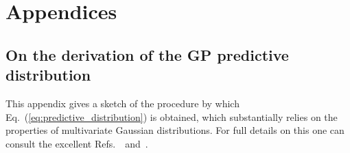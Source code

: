 
\setcounter{chapter}{-1}
\chapter{Appendices}
\renewcommand{\thechapter}{A}


\section{On the derivation of the GP predictive distribution}
\label{sec:Appendix_derivation_pred_dist}

This appendix gives a sketch of the procedure by which Eq.~(\ref{eq:predictive_distribution}) is obtained, which substantially relies on the properties of multivariate Gaussian distributions. For full details on this one can consult the excellent Refs.~\citep{Bishop:998831}~and~\citep{Williams:2006vz}.
%

